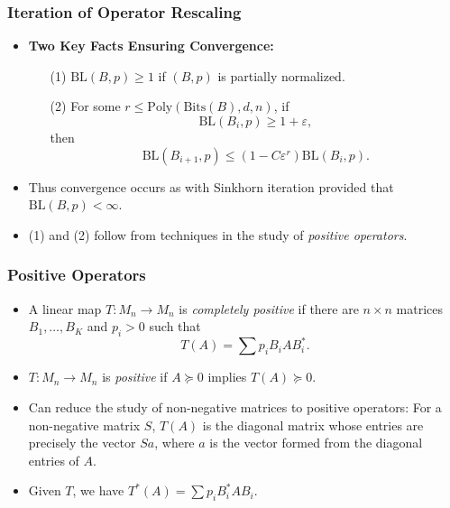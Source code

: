 \documentclass[usenames,dvipsnames,12pt]{beamer}
\begin{document}
\begin{frame}
    \frametitle{Iteration of Operator Rescaling}

    \begin{itemize}
        \item {\bf Two Key Facts Ensuring Convergence:}
        \begin{itemize}
            \pause
            \item[(1)] $\text{BL}(B,p) \geq 1$ if $(B,p)$ is partially normalized.
            \pause
            \item[(2)] For some $r \leq \text{Poly}(\text{Bits}(B),d,n)$, if
            \[ \text{BL}(B_i,p) \geq 1 + \varepsilon, \]
            then
            \[ \text{BL}(B_{i+1},p) \leq (1 - C \varepsilon^r) \text{BL}(B_i,p). \]
        \end{itemize}

        \pause
        \item Thus convergence occurs as with Sinkhorn iteration provided that $\text{BL}(B,p) < \infty$.

        \pause
        \item (1) and (2) follow from techniques in the study of \emph{positive operators}.
    \end{itemize}

\end{frame}


\begin{frame}
    \frametitle{Positive Operators}

    \begin{itemize}
        \item A linear map $T: M_n \to M_n$ is \emph{completely positive} if there are $n \times n$ matrices $B_1,\dots,B_K$ and $p_i > 0$ such that
        \[ T(A) = \sum p_i B_i A B_i^*. \]

        \pause
        \item $T: M_n \to M_n$ is \emph{positive} if $A \succeq 0$ implies $T(A) \succeq 0$.

        \pause
        \item Can reduce the study of non-negative matrices to positive operators: For a non-negative matrix $S$, $T(A)$ is the diagonal matrix whose entries are precisely the vector $Sa$, where $a$ is the vector formed from the diagonal entries of $A$.

        \pause
        \item Given $T$, we have $T^*(A) = \sum p_i B_i^* A B_i$.
    \end{itemize}
\end{frame}
\end{document}
